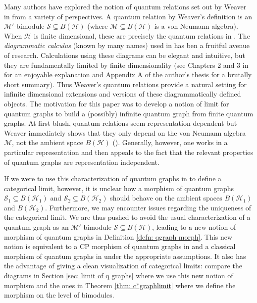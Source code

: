 \documentclass[12pt]{article}
\theoremstyle{definition}
\newcommand{\mc}[1]{\mathcal{#1}}
\newcommand{\<}{\langle}
\renewcommand{\>}{\rangle}
\renewcommand{\subset}{\subseteq}
\begin{document}
Many authors have explored the notion of quantum relations set out by Weaver in \cite{weaverqrelations} from a variety of perspectives. A quantum relation by Weaver's definition is an $\mc M'$-bimodule $\mc S \subset B(\mc H)$ (where $\mc M \subset B(\mc H)$ is a von Neumann algebra). When $\mc H$ is finite dimensional, these are precisely the quantum relations in \cite[Section 7]{musto-reutter-verdon}. The \textit{diagrammatic calculus} (known by many names) used in \cite{musto-reutter-verdon} has ben a fruitful avenue of research. Calculations using these diagrams can be elegant and intuitive, but they are fundamentally limited by finite dimensionality (see Chapters 2 and 3 in \cite{heunen-vicary} for an enjoyable explanation and Appendix A of the author's thesis for a brutally short summary). Thus Weaver's quantum relations provide a natural setting for infinite dimensional extensions and versions of these diagrammatically defined objects. The motivation for this paper was to develop a notion of limit for quantum graphs to build a (possibly) infinite quantum graph from finite quantum graphs. At first blush, quantum relations seem representation dependent but Weaver immediately shows that they only depend on the von Neumann algebra $\mc M$, not the ambient space $B(\mc H)$ (\cite[Theorem 2.7]{weaverqrelations}). Generally, however, one works in a particular representation and then appeals to the fact that the relevant properties of quantum graphs are representation independent.

If we were to use this characterization of quantum graphs in to define a categorical limit, however, it is unclear how a morphism of quantum graphs $\mc S_1 \subset B(\mc H_1)$ and $\mc S_2 \subset B(\mc H_2)$ should behave on the ambient spaces $B(\mc H_1)$ and $B(\mc H_2)$. Furthermore, we may encounter issues regarding the uniqueness of the categorical limit. We are thus pushed to avoid the usual characterization of a quantum graph as an $\mc M'$-bimodule $\mc S \subset B(\mc H)$, leading to a new notion of morphism of quantum graphs in Definition \ref{defn: qgraph morph}. This new notion is equivalent to a CP morphism of quantum graphs in \cite[Definition 7.1]{daws} and a classical morphism of quantum graphs in \cite[Definition 5.4]{musto-reutter-verdon} under the appropriate assumptions. It also has the advantage of giving a clean visualization of categorical limits: compare the diagrams in Section \ref{sec: limit of q graphs} where we use this new notion of morphism and the ones in Theorem \ref{thm: c*graphlimit} where we define the morphism on the level of bimodules.
\end{document}
